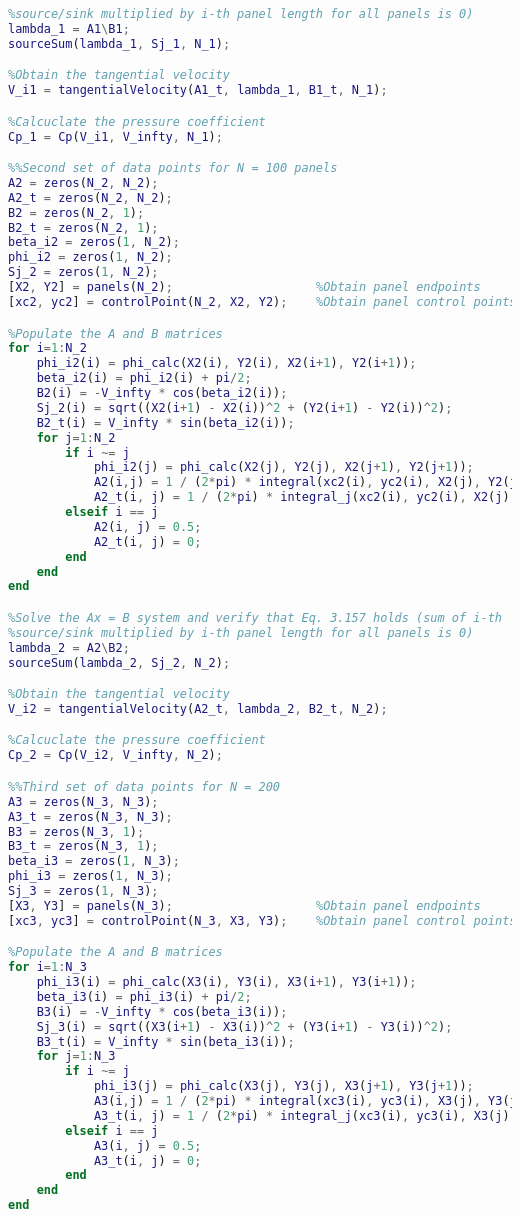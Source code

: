 \documentclass[12pt]{article}
\begin{document}
\begin{lstlisting}[language=Matlab]
%Solve the Ax = B system and verify that Eq. 3.157 holds (sum of i-th
%source/sink multiplied by i-th panel length for all panels is 0)
lambda_1 = A1\B1;
sourceSum(lambda_1, Sj_1, N_1);

%Obtain the tangential velocity
V_i1 = tangentialVelocity(A1_t, lambda_1, B1_t, N_1);

%Calcuclate the pressure coefficient
Cp_1 = Cp(V_i1, V_infty, N_1);

%%Second set of data points for N = 100 panels
A2 = zeros(N_2, N_2);
A2_t = zeros(N_2, N_2);
B2 = zeros(N_2, 1);
B2_t = zeros(N_2, 1);
beta_i2 = zeros(1, N_2);
phi_i2 = zeros(1, N_2);
Sj_2 = zeros(1, N_2);
[X2, Y2] = panels(N_2);                    %Obtain panel endpoints
[xc2, yc2] = controlPoint(N_2, X2, Y2);    %Obtain panel control points

%Populate the A and B matrices
for i=1:N_2
    phi_i2(i) = phi_calc(X2(i), Y2(i), X2(i+1), Y2(i+1));
    beta_i2(i) = phi_i2(i) + pi/2;
    B2(i) = -V_infty * cos(beta_i2(i)); 
    Sj_2(i) = sqrt((X2(i+1) - X2(i))^2 + (Y2(i+1) - Y2(i))^2);
    B2_t(i) = V_infty * sin(beta_i2(i));
    for j=1:N_2
        if i ~= j
            phi_i2(j) = phi_calc(X2(j), Y2(j), X2(j+1), Y2(j+1));
            A2(i,j) = 1 / (2*pi) * integral(xc2(i), yc2(i), X2(j), Y2(j), X2(j+1), Y2(j+1), phi_i2(i), phi_i2(j));
            A2_t(i, j) = 1 / (2*pi) * integral_j(xc2(i), yc2(i), X2(j), Y2(j), X2(j+1), Y2(j+1), phi_i2(i), phi_i2(j));
        elseif i == j
            A2(i, j) = 0.5;
            A2_t(i, j) = 0;
        end
    end
end

%Solve the Ax = B system and verify that Eq. 3.157 holds (sum of i-th
%source/sink multiplied by i-th panel length for all panels is 0)
lambda_2 = A2\B2;
sourceSum(lambda_2, Sj_2, N_2);

%Obtain the tangential velocity
V_i2 = tangentialVelocity(A2_t, lambda_2, B2_t, N_2);

%Calcuclate the pressure coefficient
Cp_2 = Cp(V_i2, V_infty, N_2);

%%Third set of data points for N = 200
A3 = zeros(N_3, N_3);
A3_t = zeros(N_3, N_3);
B3 = zeros(N_3, 1);
B3_t = zeros(N_3, 1);
beta_i3 = zeros(1, N_3);
phi_i3 = zeros(1, N_3);
Sj_3 = zeros(1, N_3);
[X3, Y3] = panels(N_3);                    %Obtain panel endpoints
[xc3, yc3] = controlPoint(N_3, X3, Y3);    %Obtain panel control points

%Populate the A and B matrices
for i=1:N_3
    phi_i3(i) = phi_calc(X3(i), Y3(i), X3(i+1), Y3(i+1));
    beta_i3(i) = phi_i3(i) + pi/2;
    B3(i) = -V_infty * cos(beta_i3(i)); 
    Sj_3(i) = sqrt((X3(i+1) - X3(i))^2 + (Y3(i+1) - Y3(i))^2);
    B3_t(i) = V_infty * sin(beta_i3(i));
    for j=1:N_3
        if i ~= j
            phi_i3(j) = phi_calc(X3(j), Y3(j), X3(j+1), Y3(j+1));
            A3(i,j) = 1 / (2*pi) * integral(xc3(i), yc3(i), X3(j), Y3(j), X3(j+1), Y3(j+1), phi_i3(i), phi_i3(j));
            A3_t(i, j) = 1 / (2*pi) * integral_j(xc3(i), yc3(i), X3(j), Y3(j), X3(j+1), Y3(j+1), phi_i3(i), phi_i3(j));
        elseif i == j
            A3(i, j) = 0.5;
            A3_t(i, j) = 0;
        end
    end
end


\end{lstlisting}
\end{document}
